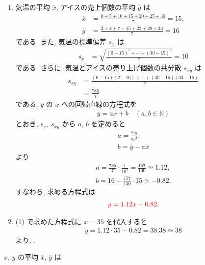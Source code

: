 \begin{qenumerate}
{\begin{figure}[H]
		\end{figure}
	}
	\item{
		\begin{enumerate}
			\item{
				気温の平均 $\overline{x}$, アイスの売上個数の平均 $\overline{y}$ は
				\begin{align}
					\overline{x} &= \frac{0 + 5 + 10 + 15 + 20 + 25 + 30}{7} = 15, \\
					\overline{y} &= \frac{2 + 4 + 7 + 15 + 23 + 28 + 33}{7} = 16
				\end{align}
				である.
				また, 気温の標準偏差 $s_{x}$ は
				\begin{align}
					s_{x} &= \sqrt{\frac{(0 - 15)^{2} + \cdots + (30 - 15)^{2}}{7}} = 10
				\end{align}
				である.
				さらに, 気温とアイスの売り上げ個数の共分散 $s_{xy}$ は
				\begin{align}
					s_{xy} &= \frac{(0 - 15)(2 - 16) + \cdots + (30 - 15)(33 - 16)}{7} \\
						&= \frac{785}{7}
				\end{align}
				である.
				$y$ の $x$ への回帰直線の方程式を
				\begin{align}
					y=ax + b\quad (a, b\in\mathbb{R})
				\end{align}
				とおき, $s_{x}$, $s_{xy}$ から $a$, $b$ を定めると
				\begin{gather}
					a = \frac{s_{xy}}{{s_{x}}^{2}}, \\
					b = \overline{y} - a\overline{x}
				\end{gather}
				より
				\begin{gather}
					a = \frac{785}{7}\cdot \frac{1}{10^{2}} = \frac{157}{140} \simeq 1.12, \\
					b = 16 - \frac{157}{140}\cdot 15 \simeq -0.82.
				\end{gather}
				すなわち, 求める方程式は
				\begin{align}
					\textcolor{red}{y = 1.12x - 0.82}.
				\end{align}
			}
			\item{
				(1) で求めた方程式に $x = 35$ を代入すると
				\begin{align}
					y = 1.12\cdot 35 - 0.82 = 38.38 \simeq 38
				\end{align}
				より, .
			}
		\end{enumerate}
	}
	\item{
		$x$, $y$ の平均 $\overline{x}$, $\overline{y}$ は
		\begin{align}

\end{align}}
\end{qenumerate}
